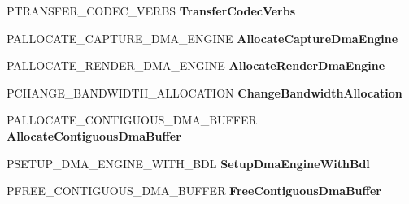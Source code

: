 \begin{DoxyCompactItemize}
P\+T\+R\+A\+N\+S\+F\+E\+R\+\_\+\+C\+O\+D\+E\+C\+\_\+\+V\+E\+R\+BS {\bfseries Transfer\+Codec\+Verbs}
\item 
\mbox{\label{struct___h_d_a_u_d_i_o___b_u_s___i_n_t_e_r_f_a_c_e___b_d_l_add0083e8c5229454bf72eaf8da4ceb20}} 
P\+A\+L\+L\+O\+C\+A\+T\+E\+\_\+\+C\+A\+P\+T\+U\+R\+E\+\_\+\+D\+M\+A\+\_\+\+E\+N\+G\+I\+NE {\bfseries Allocate\+Capture\+Dma\+Engine}
\item 
\mbox{\label{struct___h_d_a_u_d_i_o___b_u_s___i_n_t_e_r_f_a_c_e___b_d_l_aca647329e42f11af00a3a5f34e3cf0cc}} 
P\+A\+L\+L\+O\+C\+A\+T\+E\+\_\+\+R\+E\+N\+D\+E\+R\+\_\+\+D\+M\+A\+\_\+\+E\+N\+G\+I\+NE {\bfseries Allocate\+Render\+Dma\+Engine}
\item 
\mbox{\label{struct___h_d_a_u_d_i_o___b_u_s___i_n_t_e_r_f_a_c_e___b_d_l_a8cb0017532728795078931ad63793785}} 
P\+C\+H\+A\+N\+G\+E\+\_\+\+B\+A\+N\+D\+W\+I\+D\+T\+H\+\_\+\+A\+L\+L\+O\+C\+A\+T\+I\+ON {\bfseries Change\+Bandwidth\+Allocation}
\item 
\mbox{\label{struct___h_d_a_u_d_i_o___b_u_s___i_n_t_e_r_f_a_c_e___b_d_l_a495092e57f9ce68e6dca5e3a1451662e}} 
P\+A\+L\+L\+O\+C\+A\+T\+E\+\_\+\+C\+O\+N\+T\+I\+G\+U\+O\+U\+S\+\_\+\+D\+M\+A\+\_\+\+B\+U\+F\+F\+ER {\bfseries Allocate\+Contiguous\+Dma\+Buffer}
\item 
\mbox{\label{struct___h_d_a_u_d_i_o___b_u_s___i_n_t_e_r_f_a_c_e___b_d_l_a9a731ac1934fb360b7ac800d8ea0f729}} 
P\+S\+E\+T\+U\+P\+\_\+\+D\+M\+A\+\_\+\+E\+N\+G\+I\+N\+E\+\_\+\+W\+I\+T\+H\+\_\+\+B\+DL {\bfseries Setup\+Dma\+Engine\+With\+Bdl}
\item 
\mbox{\label{struct___h_d_a_u_d_i_o___b_u_s___i_n_t_e_r_f_a_c_e___b_d_l_aefe5643e39a658728402cb07fb022599}} 
P\+F\+R\+E\+E\+\_\+\+C\+O\+N\+T\+I\+G\+U\+O\+U\+S\+\_\+\+D\+M\+A\+\_\+\+B\+U\+F\+F\+ER {\bfseries Free\+Contiguous\+Dma\+Buffer}
\item 
\mbox{\label{struct___h_d_a_u_d_i_o___b_u_s___i_n_t_e_r_f_a_c_e___b_d_l_abb88369f4f1d6181035de5b8f96c505c}} 

\end{DoxyCompactItemize}
